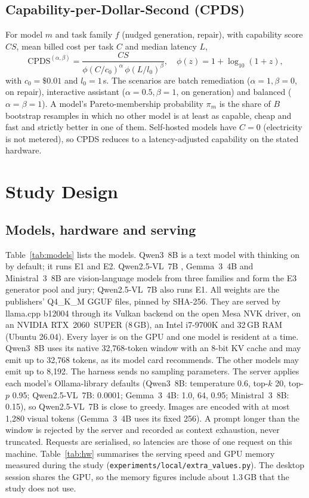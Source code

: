 \documentclass[conference]{IEEEtran}
\newcommand{\Q}{Qwen3~8B}
\newcommand{\QV}{Qwen2.5-VL~7B}
\newcommand{\GM}{Gemma~3~4B}
\newcommand{\MI}{Ministral~3~8B}
\begin{document}
\subsection{Capability-per-Dollar-Second (CPDS)}
For model $m$ and task family $f$ (nudged generation, repair), with capability score $CS$,
mean billed cost per task $C$ and median latency $L$,
\begin{equation}
\mathrm{CPDS}^{(\alpha,\beta)} = \frac{CS}{\phi(C/c_0)^{\alpha}\,\phi(L/l_0)^{\beta}},\quad
\phi(z) = 1+\log_{10}(1+z),
\end{equation}
with $c_0 = \$0.01$ and $l_0 = 1$\,s. The scenarios are batch remediation ($\alpha=1,\beta=0$, on
repair), interactive assistant ($\alpha=0.5,\beta=1$, on generation) and balanced
($\alpha=\beta=1$). A model's Pareto-membership probability $\pi_m$ is the share of $B$ bootstrap
resamples in which no other model is at least as capable, cheap and fast and strictly better in
one of them. Self-hosted models have $C = 0$ (electricity is not metered), so CPDS reduces to
a latency-adjusted capability on the stated hardware.

\section{Study Design}

\subsection{Models, hardware and serving}
Table~\ref{tab:models} lists the models. \Q{} \cite{qwen3} is a text model with thinking on by
default; it runs E1 and E2. \QV{} \cite{qwen25vl}, \GM{} \cite{gemma3} and \MI{}
\cite{ministral3} are vision-language models from three families and form the E3 generator
pool and jury; \QV{} also runs E1. All weights are the publishers' Q4\_K\_M GGUF files, pinned
by SHA-256. They are served by llama.cpp b12004 \cite{llamacpp} through its Vulkan backend on
the open Mesa NVK driver, on an NVIDIA RTX~2060~SUPER (8\,GB), an Intel i7-9700K and 32\,GB
RAM (Ubuntu 26.04). Every layer is on the GPU and one model is resident at a time.
\Q{} uses its native 32{,}768-token window with an 8-bit KV cache and may emit up to 32{,}768
tokens, as its model card recommends. The other models may emit up to 8{,}192. The harness
sends no sampling parameters. The server applies each model's Ollama-library defaults (\Q:
temperature 0.6, top-$k$ 20, top-$p$ 0.95; \QV: 0.0001; \GM: 1.0, 64, 0.95; \MI: 0.15), so \QV{} is
close to greedy. Images are encoded with at most 1{,}280 visual tokens (\GM{} uses its fixed
256). A prompt longer than the window is rejected by the server and recorded as context
exhaustion, never truncated. Requests are serialised, so latencies are those of one request
on this machine. Table~\ref{tab:hw} summarises the serving speed and GPU memory measured during
the study (\texttt{experiments/local/extra\_values.py}). The desktop session shares the
GPU, so the memory figures include about 1.3\,GB that the study does not use.
\end{document}
